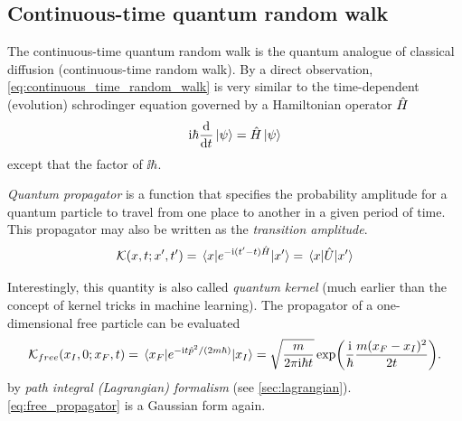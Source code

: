 \subsection{Continuous-time quantum random walk}\label{sec:ct_quantum_walk}
The continuous-time quantum random walk \cite{childsExampleDifferenceQuantum2002} is the quantum analogue of classical diffusion (continuous-time random walk).
By a direct observation, \cref{eq:continuous_time_random_walk} is very similar to the time-dependent (evolution) schrodinger equation governed by a Hamiltonian operator $\hat{H}$
\begin{equation}
	\textup{i}\hbar \dv{t} \ket{\psi} = \hat{H} \ket{\psi}
	\label{eq:evolution}
\end{equation}
except that the factor of $\ii\hbar$.
\begin{definition}\label{def:quantum_propagator}
	\emph{Quantum propagator} is a function that specifies the probability amplitude for a quantum particle to travel from one place to another in a given period of time.
	This propagator may also be written as the \emph{transition amplitude}.
	\begin{equation}
		\mathcal{K} (x,t;x',t')
		=
		\mel{x}{e^{-\textup{i}(t'-t) \hat{H}}}{x'}
		=
		\mel{x}{\hat{U}}{x'}
	\end{equation}
\end{definition}
Interestingly, this quantity is also called \emph{quantum kernel} (much earlier than the concept of kernel tricks in machine learning).
The propagator of a one-dimensional free particle can be evaluated 
\begin{equation}
	\mathcal{K}_{free}(x_I,0;x_F,t)  =
	\mel{x_F}{e^{-\textup{i}t \hat{p}^2/(2m\hbar) }}{x_I}
    =
	\sqrt{\frac{m}{2\pi \textup{i} \hbar t}}
    \exp(\frac{\textup{i}}{\hbar}\frac{m (x_F-x_I)^2}{2t}).
    \label{eq:free_propagator}
\end{equation}
by \emph{path integral (Lagrangian) formalism} (see \cref{sec:lagrangian}).
\cref{eq:free_propagator} is a Gaussian form again.

